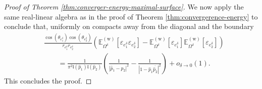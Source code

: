 \documentclass[reqno]{amsart}
\numberwithin{equation}{section}
\theoremstyle{definition}
\theoremstyle{remark}
\begin{document}
\begin{proof}[Proof of Theorem \ref{thm:converger-energy-maximal-surface}]
We now apply the same real-linear algebra as in the proof of Theorem \ref{thm:convergerence-energy} to conclude that, uniformly on compacts away from the diagonal and the boundary
\[
\begin{aligned}
&\frac{
        \cos(\theta_{e_1^\delta})\cos(\theta_{e_2^\delta})
        }
        {r_{e_1^\delta}r_{e_2^\delta}}
\left(
\mathbb E^{(\mathrm w)}_{\Omega^\delta}
[\varepsilon_{e_1^\delta}\varepsilon_{e_2^\delta}]
-
\mathbb E^{(\mathrm w)}_{\Omega^\delta}
[\varepsilon_{e_1^\delta}]
\mathbb E^{(\mathrm w)}_{\Omega^\delta}
[\varepsilon_{e_2^\delta}]
\right)\\
&\qquad =
        \frac{1}{\pi^2\mathfrak l(\hat p_1)\mathfrak l(\hat p_2)}
        \left(
        \frac{1}{|\hat p_1-\hat p_2|^2}
        -
        \frac{1}{|1-\hat p_1\overline{\hat p_2}|^2}
        \right)
        +o_{\delta\to0}(1).
\end{aligned}
\]
This concludes the proof.
\end{proof}
\end{document}
